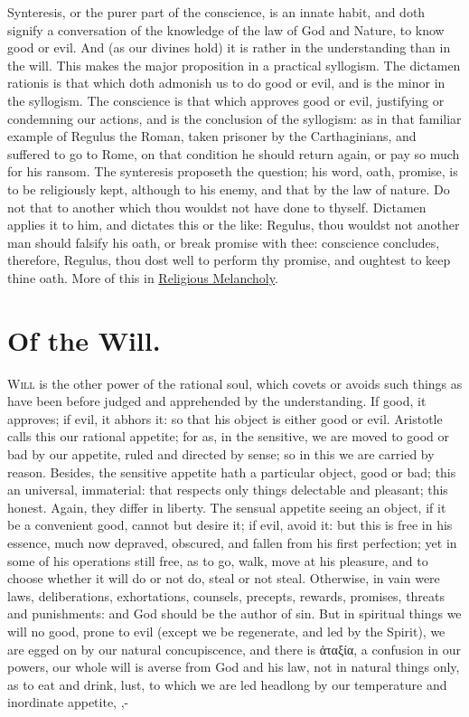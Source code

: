 {Synteresis, or the purer part of the conscience, is an innate habit,
and doth signify a conversation of the knowledge of the law of God and
Nature, to know good or evil. And (as our divines hold) it is rather in
the understanding than in the will. This makes the major proposition in
a practical syllogism. The dictamen rationis is that which doth
admonish us to do good or evil, and is the minor in the syllogism. The
conscience is that which approves good or evil, justifying or
condemning our actions, and is the conclusion of the syllogism: as in
that familiar example of Regulus the Roman, taken prisoner by the
Carthaginians, and suffered to go to Rome, on that condition he should
return again, or pay so much for his ransom. The synteresis proposeth
the question; his word, oath, promise, is to be religiously kept,
although to his enemy, and that by the law of nature. Do not that
to another which thou wouldst not have done to thyself. Dictamen
applies it to him, and dictates this or the like: Regulus, thou wouldst
not another man should falsify his oath, or break promise with thee:
conscience concludes, therefore, Regulus, thou dost well to perform thy
promise, and oughtest to keep thine oath. More of this in \hyperref[ch:religious-melancholy]{Religious
Melancholy}.

\section{Of the Will.}

\lettrine{W}{ill} is the other power of the rational soul, which covets or
avoids such things as have been before judged and apprehended by the
understanding. If good, it approves; if evil, it abhors it: so that his
object is either good or evil. Aristotle calls this our rational
appetite; for as, in the sensitive, we are moved to good or bad by our
appetite, ruled and directed by sense; so in this we are carried by
reason. Besides, the sensitive appetite hath a particular object, good
or bad; this an universal, immaterial: that respects only things
delectable and pleasant; this honest. Again, they differ in liberty.
The sensual appetite seeing an object, if it be a convenient good,
cannot but desire it; if evil, avoid it: but this is free in his
essence, much now depraved, obscured, and fallen from his first
perfection; yet in some of his operations still free, as to go, walk,
move at his pleasure, and to choose whether it will do or not do, steal
or not steal. Otherwise, in vain were laws, deliberations,
exhortations, counsels, precepts, rewards, promises, threats and
punishments: and God should be the author of sin. But in 
spiritual things we will no good, prone to evil (except we be
regenerate, and led by the Spirit), we are egged on by our natural
concupiscence, and there is \textgreek{ἀταξία}, a confusion in our powers,
our whole will is averse from God and his law, not in natural
things only, as to eat and drink, lust, to which we are led headlong by
our temperature and inordinate appetite,
,-

}
